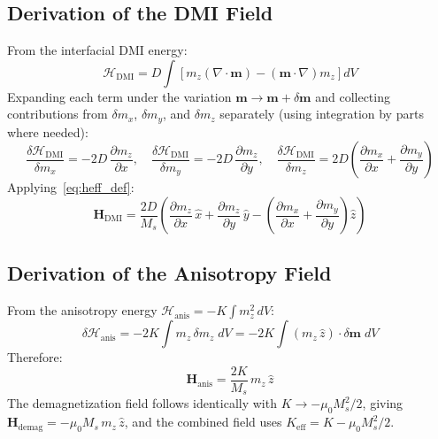 \documentclass[11pt,a4paper]{article}
\newcommand{\mb}[1]{\mathbf{#1}}
\newcommand{\zhat}{\hat{z}}
\newcommand{\Hdmi}{\mb{H}_{\text{DMI}}}
\newcommand{\Hanis}{\mb{H}_{\text{anis}}}
\newcommand{\Hdemag}{\mb{H}_{\text{demag}}}
\newcommand{\Keff}{K_{\text{eff}}}
\newcommand{\Ms}{M_s}
\begin{document}
\subsection{Derivation of the DMI Field}

From the interfacial DMI energy:
%
\begin{equation}
\mathcal{H}_{\text{DMI}} = D \int \left[
    m_z (\nabla \cdot \mb{m})
    - (\mb{m} \cdot \nabla) m_z
\right] dV
\end{equation}
%
Expanding each term under the variation
$\mb{m} \to \mb{m} + \delta\mb{m}$ and collecting contributions
from $\delta m_x$, $\delta m_y$, and $\delta m_z$ separately (using
integration by parts where needed):
%
\begin{equation}
\frac{\delta\mathcal{H}_{\text{DMI}}}{\delta m_x}
    = -2D\,\frac{\partial m_z}{\partial x}, \quad
\frac{\delta\mathcal{H}_{\text{DMI}}}{\delta m_y}
    = -2D\,\frac{\partial m_z}{\partial y}, \quad
\frac{\delta\mathcal{H}_{\text{DMI}}}{\delta m_z}
    = 2D\left(
        \frac{\partial m_x}{\partial x}
        + \frac{\partial m_y}{\partial y}
    \right)
\end{equation}
%
Applying~\eqref{eq:heff_def}:
%
\begin{equation}
\Hdmi = \frac{2D}{\Ms} \left(
    \frac{\partial m_z}{\partial x}\,\hat{x}
    + \frac{\partial m_z}{\partial y}\,\hat{y}
    - \left(
        \frac{\partial m_x}{\partial x}
        + \frac{\partial m_y}{\partial y}
    \right)\zhat
\right)
\end{equation}

\subsection{Derivation of the Anisotropy Field}

From the anisotropy energy $\mathcal{H}_{\text{anis}} = -K \int
m_z^2 \, dV$:
%
\begin{equation}
\delta\mathcal{H}_{\text{anis}} = -2K \int
    m_z \, \delta m_z \; dV
    = -2K \int (m_z \, \zhat) \cdot \delta\mb{m} \; dV
\end{equation}
%
Therefore:
%
\begin{equation}
\Hanis = \frac{2K}{\Ms} \, m_z \, \zhat
\end{equation}
%
The demagnetization field follows identically with
$K \to -\mu_0\Ms^2/2$, giving
$\Hdemag = -\mu_0\Ms \, m_z \, \zhat$, and the combined field uses
$\Keff = K - \mu_0\Ms^2/2$.
\end{document}
